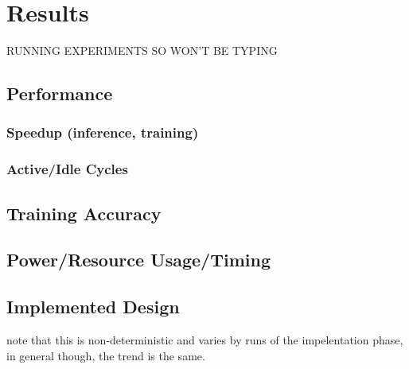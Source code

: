 \chapter{Results}
RUNNING EXPERIMENTS SO WON'T BE TYPING
\section{Performance}
\subsection{Speedup (inference, training)}
\subsection{Active/Idle Cycles}
\section{Training Accuracy}
\section{Power/Resource Usage/Timing}
\section{Implemented Design}
note that this is non-deterministic and varies by runs of the impelentation phase, in general though, the trend is the same.